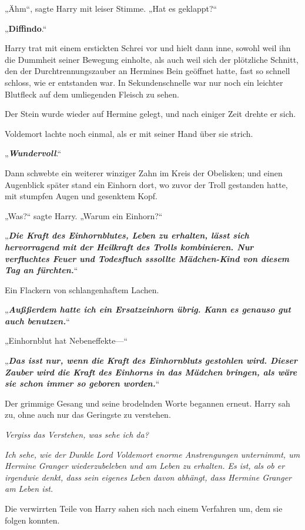 {„Ähm“, sagte Harry mit leiser Stimme. „Hat es geklappt?“

„\textbf{Diffindo}.“

Harry trat mit einem erstickten Schrei vor und hielt dann inne, sowohl weil ihn die Dummheit seiner Bewegung einholte, als auch weil sich der plötzliche Schnitt, den der Durchtrennungszauber an Hermines Bein geöffnet hatte, fast so schnell schloss, wie er entstanden war. In Sekundenschnelle war nur noch ein leichter Blutfleck auf dem umliegenden Fleisch zu sehen.

Der Stein wurde wieder auf Hermine gelegt, und nach einiger Zeit drehte er sich.

Voldemort lachte noch einmal, als er mit seiner Hand über sie strich.

„\textbf{\emph{Wundervoll}}.“

Dann schwebte ein weiterer winziger Zahn im Kreis der Obelisken; und einen Augenblick später stand ein Einhorn dort, wo zuvor der Troll gestanden hatte, mit stumpfen Augen und gesenktem Kopf.

„Was?“ sagte Harry. „Warum ein Einhorn?“

„\textbf{\emph{Die Kraft des Einhornblutes, Leben zu erhalten, lässt sich hervorragend mit der Heilkraft des Trolls kombinieren. Nur verfluchtes Feuer und Todesfluch sssollte Mädchen-Kind von diesem Tag an fürchten.}}“

Ein Flackern von schlangenhaftem Lachen.

„\textbf{\emph{Außßerdem hatte ich ein Ersatzeinhorn übrig. Kann es genauso gut auch benutzen.}}“

„Einhornblut hat Nebeneffekte—“

„\textbf{\emph{Das isst nur, wenn die Kraft des Einhornbluts gestohlen wird. Dieser Zauber wird die Kraft des Einhorns in das Mädchen bringen, als wäre sie schon immer so geboren worden.}}“

Der grimmige Gesang und seine brodelnden Worte begannen erneut. Harry sah zu, ohne auch nur das Geringste zu verstehen.

\emph{Vergiss das Verstehen, was sehe ich da?}

\emph{Ich sehe, wie der Dunkle Lord Voldemort enorme Anstrengungen unternimmt, um Hermine Granger wiederzubeleben und am Leben zu erhalten. Es ist, als ob er irgendwie denkt, dass sein eigenes Leben davon abhängt, dass Hermine Granger am Leben ist.}

Die verwirrten Teile von Harry sahen sich nach einem Verfahren um, dem sie folgen konnten.

}
